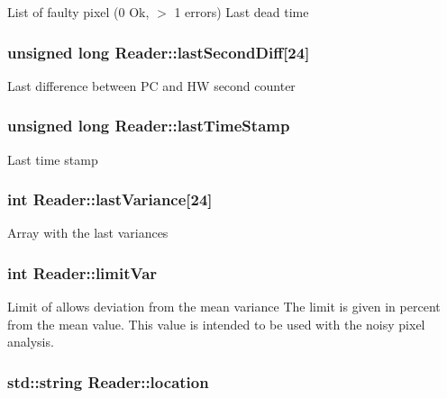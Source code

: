 List of faulty pixel (0 Ok, $>$ 1 errors) Last dead time \hypertarget{classReader_a9686e0c5ed311baa141f6021fc45c931}{
\subsubsection[{last\-Second\-Diff}]{\setlength{\rightskip}{0pt plus 5cm}unsigned long Reader\-::last\-Second\-Diff\mbox{[}24\mbox{]}\hspace{0.3cm}{\ttfamily [private]}}}\label{classReader_a9686e0c5ed311baa141f6021fc45c931}
Last difference between P\-C and H\-W second counter \hypertarget{classReader_a17df32c8ae16df4d276d73b8d955c0e6}{
\subsubsection[{last\-Time\-Stamp}]{\setlength{\rightskip}{0pt plus 5cm}unsigned long Reader\-::last\-Time\-Stamp\hspace{0.3cm}{\ttfamily [private]}}}\label{classReader_a17df32c8ae16df4d276d73b8d955c0e6}
Last time stamp \hypertarget{classReader_aa69150af33df50c03662851a660321b4}{
\subsubsection[{last\-Variance}]{\setlength{\rightskip}{0pt plus 5cm}int Reader\-::last\-Variance\mbox{[}24\mbox{]}\hspace{0.3cm}{\ttfamily [private]}}}\label{classReader_aa69150af33df50c03662851a660321b4}
Array with the last variances \hypertarget{classReader_a04a91fc12dab5c7eee7bcbf051619b16}{
\subsubsection[{limit\-Var}]{\setlength{\rightskip}{0pt plus 5cm}int Reader\-::limit\-Var\hspace{0.3cm}{\ttfamily [private]}}}\label{classReader_a04a91fc12dab5c7eee7bcbf051619b16}
Limit of allows deviation from the mean variance The limit is given in percent from the mean value. This value is intended to be used with the noisy pixel analysis. \hypertarget{classReader_a8f238308360fe50adda67d360a9d3b28}{
\subsubsection[{location}]{\setlength{\rightskip}{0pt plus 5cm}std\-::string Reader\-::location\hspace{0.3cm}{\ttfamily [private]}}}\label{classReader_a8f238308360fe50adda67d360a9d3b28}
